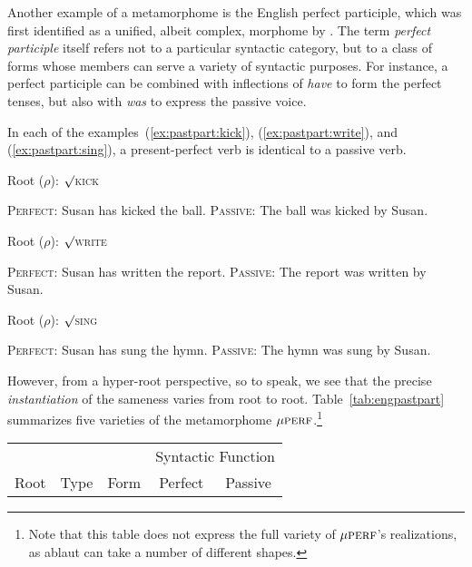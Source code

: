 {Another example of a metamorphome is the English perfect participle, which was first 
identified as a unified, albeit complex, morphome by \cite{aronoff:1994}. The term \emph{perfect participle} 
itself refers not to a particular syntactic category, but 
to a class of 
forms whose members 
can serve a variety of  syntactic purposes. For instance, a perfect participle can be combined
with inflections of \emph{have} to form the perfect tenses, but also with 
\emph{was} to express the passive voice. 

In each of the examples~(\ref{ex:pastpart:kick}), (\ref{ex:pastpart:write}), and (\ref{ex:pastpart:sing}), a present-perfect verb is identical to 
a passive verb.

\begin{exe}
\label{ex:pastpart}
	\ex Root ($\rho$): $\surd$\textsc{kick}
		\begin{xlist} \label{ex:pastpart:kick}
		\ex \textsc{Perfect:} Susan has kicked the ball. \label{ex:pastpart:kick:perf}
		\ex \textsc{Passive:} The ball was kicked by Susan.\label{ex:pastpart:kick:pass}
		\end{xlist}
	\ex Root ($\rho$): $\surd$\textsc{write}
		\begin{xlist} \label{ex:pastpart:write}
		\ex \textsc{Perfect:} Susan has written the report. \label{ex:pastpart:write:perf}
		\ex \textsc{Passive:} The report was written by Susan. \label{ex:pastpart:write:pass}
		\end{xlist}
	\ex Root ($\rho$): $\surd$\textsc{sing}
		\begin{xlist} \label{ex:pastpart:sing}
		\ex \textsc{Perfect:} Susan has sung the hymn. \label{ex:pastpart:sing:perf}
		\ex \textsc{Passive:} The hymn was sung by Susan. \label{ex:pastpart:sing:pass}
		\end{xlist}
\end{exe}
However,
from a hyper-root perspective, so to speak, we see that the precise \emph{instantiation} of the sameness varies from root to root.  
Table~\ref{tab:engpastpart} summarizes five varieties of the metamorphome $\mu{\textsc{perf}}$.\footnote{Note that this table
does not express the full variety of $\mu{\textsc{perf}}$'s realizations, as ablaut can take a number of different shapes.}
\begin{table}[ht]
\centering
\setlength{\extrarowheight}{8pt}
\begin{tabular}{c c c c c}
\toprule
& & & \multicolumn{2}{c}{Syntactic Function} \\[-1ex] 
Root & Type & Form & Perfect & Passive  \\ [0.5ex]

\end{tabular}
\end{table}}
